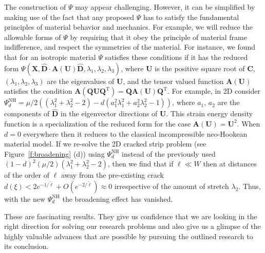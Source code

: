 \documentclass[10pt,letterpaper]{article}
\newcommand{\bs}[1]{\ensuremath{\boldsymbol{#1}}}
\begin{document}
    The construction of $\mathsf{\Psi}$ may appear challenging.
    However, it can be simplified by making use of the fact that any proposed $\mathsf{\Psi}$ has to satisfy the fundamental principles of material behavior and mechanics.
    For example, we will reduce the allowable forms of $\mathsf{\Psi}$ by requiring that it obey the principle of material frame indifference, and respect the symmetries of the material.
    For instance, we found that for an isotropic material ${\mathsf{\Psi}}$ satisfies these conditions if it
    has the reduced form ${\mathsf{\Psi}}(\bs{X}, \hat{\bs{D}}\cdot\mathbf{A}(\bs{U})\hat{\bs{D}}, \lambda_1, \lambda_2,\lambda_3)$,
    where $\bs{U}$ is the positive square root of $\bs{C}$, $(\lambda_1,\lambda_2,\lambda_3)$ are the eigenvalues of $\bs{U}$, and the tensor valued function $\bs{A}(\bs{U})$ satisfies the condition $
    \bs{A}(\bs{Q}\bs{U}\bs{Q}^{\text{T}})=\bs{Q}\bs{A}(\bs{U})\bs{Q}^{\text{T}}$.
    For example, in 2D consider $\mathsf{\Psi}_d^{\text{NH}}=\mu/2((\lambda_1^2+\lambda_2^2-2)-d( a_1^2\lambda_1^2+a_2^2\lambda_2^2-1))$, where $a_1$, $a_2$ are the components of $\hat{\bs{D}}$ in the eigenvector directions of $\bs{U}$.
    This strain energy density function is a specialization of the reduced form for the case $\bs{A}(\bs{U})=\bs{U}^2$.
    When $d=0$ everywhere then it reduces to the classical incompressible neo-Hookean material model.
    If we re-solve the 2D cracked strip problem (see Figure~\ref{f:broadening} (d)) using $\mathsf{\Psi}_d^{\text{NH}}$ instead of the previously used $(1-d)^2 (\mu/2)(\lambda_1^2+\lambda_2^2-2)$, then we find that if $\ell \ll W$ then at distances of the order of $\ell$ away from the pre-existing crack $d(\xi)<  2e^{-1/\tilde{\ell}}+O(e^{-2/\tilde{\ell}})\approx 0$ irrespective of the amount of stretch $\lambda_2$.
    Thus, with the new $\mathsf{\Psi}_d^{\text{NH}}$ the broadening effect has vanished.

    These are fascinating results. They give us confidence that we are looking in the right direction for solving our research problems and also give us a glimpse of the highly valuable advances that are possible by pursuing the outlined research to its conclusion.
\end{document}
